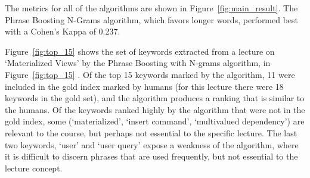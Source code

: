 The metrics for all of the algorithms are shown in
Figure~\ref{fig:main_result}. The Phrase Boosting N-Grams algorithm,
which favors longer words, performed best with a Cohen's Kappa of
0.237.



Figure~\ref{fig:top_15} shows the set of keywords extracted from a
lecture on `Materialized Views' by the Phrase Boosting with N-grams
algorithm, in Figure~\ref{fig:top_15} . Of the top 15 keywords marked
by the algorithm, 11 were included in the gold index marked by humans
(for this lecture there were 18 keywords in the gold set), and the
algorithm produces a ranking that is similar to the humans. Of the
keywords ranked highly by the algorithm that were not in the gold
index, some (`materialized', `insert command', `multivalued
dependency') are relevant to the course, but perhaps not essential to
the specific lecture. The last two keywords, `user' and `user query'
expose a weakness of the algorithm, where it is difficult to discern
phrases that are used frequently, but not essential to the lecture
concept.

